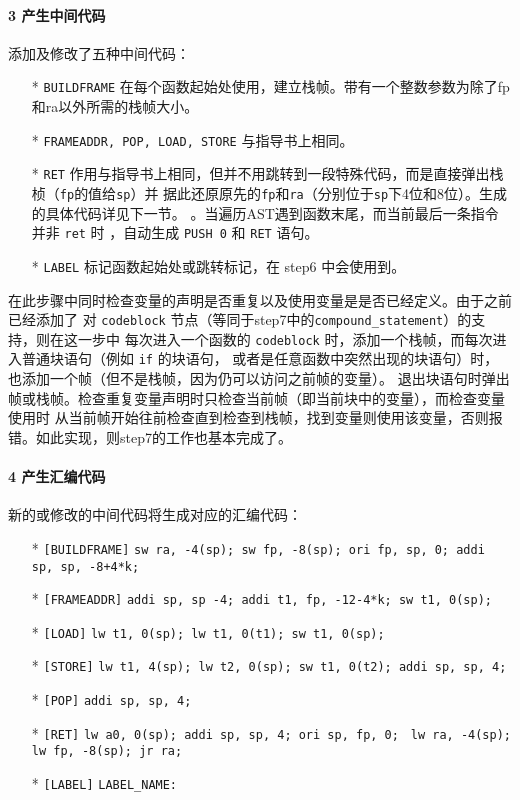 \documentclass[UTF8]{ctexart}
\newcommand{\T}[1]{\texttt{{#1}}}
\begin{document}
            \paragraph{3 产生中间代码} 添加及修改了五种中间代码：
            \begin{itemize}
                \item[*] \T{BUILDFRAME} 在每个函数起始处使用，建立栈帧。带有一个整数参数为除了fp和ra以外所需的栈帧大小。
                \item[*] \T{FRAMEADDR, POP, LOAD, STORE} 与指导书上相同。
                \item[*] \T{RET} 作用与指导书上相同，但并不用跳转到一段特殊代码，而是直接弹出栈桢（\T{fp}的值给\T{sp}）并
                据此还原原先的\T{fp}和\T{ra}（分别位于\T{sp}下4位和8位）。生成的具体代码详见下一节。
                。当遍历AST遇到函数末尾，而当前最后一条指令并非 \T{ret} 时
                ，自动生成 \T{PUSH 0} 和 \T{RET} 语句。
                \item[*] \T{LABEL} 标记函数起始处或跳转标记，在 step6 中会使用到。
            \end{itemize}

            在此步骤中同时检查变量的声明是否重复以及使用变量是是否已经定义。由于之前已经添加了
            对 \T{codeblock} 节点（等同于step7中的\T{compound\_statement}）的支持，则在这一步中
            每次进入一个函数的 \T{codeblock} 时，添加一个栈帧，而每次进入普通块语句（例如 \T{if} 的块语句，
            或者是任意函数中突然出现的块语句）时，也添加一个帧（但不是栈帧，因为仍可以访问之前帧的变量）。
            退出块语句时弹出帧或栈帧。检查重复变量声明时只检查当前帧（即当前块中的变量），而检查变量使用时
            从当前帧开始往前检查直到检查到栈帧，找到变量则使用该变量，否则报错。如此实现，则step7的工作也基本完成了。
 
            \paragraph{4 产生汇编代码} 新的或修改的中间代码将生成对应的汇编代码：
            \begin{itemize}
                \item[*] \T{[BUILDFRAME]} \T{sw ra, -4(sp); sw fp, -8(sp); ori fp, sp, 0; addi sp, sp, -8+4*k;}
                \item[*] \T{[FRAMEADDR]} \T{addi sp, sp -4; addi t1, fp, -12-4*k; sw t1, 0(sp);}
                \item[*] \T{[LOAD]} \T{lw t1, 0(sp); lw t1, 0(t1); sw t1, 0(sp);}
                \item[*] \T{[STORE]} \T{lw t1, 4(sp); lw t2, 0(sp); sw t1, 0(t2); addi sp, sp, 4;} 
                \item[*] \T{[POP]} \T{addi sp, sp, 4;} 
                \item[*] \T{[RET]} \T{lw a0, 0(sp); addi sp, sp, 4; ori sp, fp, 0; } 
                \T{lw ra, -4(sp); lw fp, -8(sp); jr ra;} 
                \item[*] \T{[LABEL]} \T{LABEL\_NAME: }
            \end{itemize}
        
\end{document}
